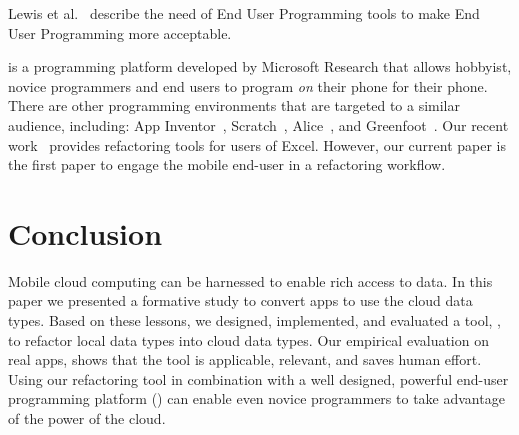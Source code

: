 \documentclass[preprint]{sigplanconf}
\begin{document}
Lewis et al.~\cite{lewis2009report} describe the need of End User Programming tools to make End User Programming more acceptable.  

\TD is a programming platform developed by Microsoft Research that allows hobbyist, novice programmers and end users  to program \emph{on} their phone for their phone.  There are other programming environments that are targeted to a similar audience, including:  App Inventor~\cite{Wolber}, Scratch~\cite{maloney2010scratch}, Alice~\cite{cooper2010design}, and Greenfoot~\cite{kolling2010greenfoot}. 
Our recent work~\cite{badame2012refactoring} provides refactoring tools for users of Excel. 
However, our current paper is the first paper to engage the mobile end-user in a refactoring workflow.

\section{Conclusion}
\label{sec:conclusions}
Mobile cloud computing can be harnessed to enable rich access to data. 
In this paper we presented a formative study to convert \numFormative apps to use the \TD cloud data types. 
Based on these lessons, we designed, implemented, and evaluated a tool,  \tool,  to refactor local data types into cloud data types.  
Our empirical evaluation on \numScripts real apps, shows that the tool is applicable, relevant, and saves human effort.
Using our refactoring tool in combination with a well designed, powerful end-user programming platform (\TD) can enable even novice programmers to take advantage of the power of the cloud.








\end{document}
